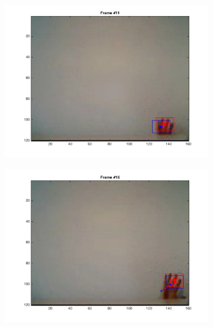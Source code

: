 \documentclass{ethz_report}
\begin{document}
\begin{figure}[h]
    \centering
    \begin{subfigure}[b]{.25\textwidth}
        \centering
        \includegraphics[width=1\linewidth]{images/video1_1}
    \end{subfigure}%
    \begin{subfigure}[b]{.25\textwidth}
        \centering
        \includegraphics[width=1\linewidth]{images/video1_6}
    \end{subfigure}%
    \begin{subfigure}[b]{.25\textwidth}
        \centering

\end{subfigure}
\end{figure}
\end{document}
